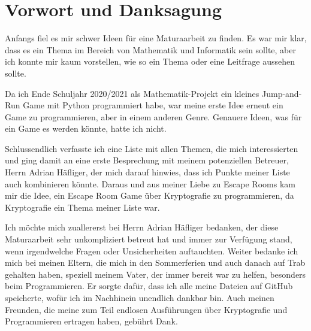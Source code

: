 \section{Vorwort und Danksagung}
\label{sec:vorwort}

Anfangs fiel es mir schwer Ideen für eine Maturaarbeit zu finden. Es war mir klar, dass es ein Thema im Bereich von Mathematik und Informatik sein sollte, aber ich konnte mir kaum vorstellen, wie so ein Thema oder eine Leitfrage aussehen sollte.

Da ich Ende Schuljahr 2020/2021 als Mathematik-Projekt ein kleines Jump-and-Run Game mit Python programmiert habe, war meine erste Idee erneut ein Game zu programmieren, aber in einem anderen Genre. Genauere Ideen, was für ein Game es werden könnte, hatte ich nicht.

Schlussendlich verfasste ich eine Liste mit allen Themen, die mich interessierten und ging damit an eine erste Besprechung mit meinem potenziellen Betreuer, Herrn Adrian Häfliger, der mich darauf hinwies, dass ich Punkte meiner Liste auch kombinieren könnte. Daraus und aus meiner Liebe zu Escape Rooms kam mir die Idee, ein Escape Room Game über Kryptografie zu programmieren, da Kryptografie ein Thema meiner Liste war.

Ich möchte mich zuallererst bei Herrn Adrian Häfliger bedanken, der diese Maturaarbeit sehr unkompliziert betreut hat und immer zur Verfügung stand, wenn irgendwelche Fragen oder Unsicherheiten auftauchten. Weiter bedanke ich mich bei meinen Eltern, die mich in den Sommerferien und auch danach auf Trab gehalten haben, speziell meinem Vater, der immer bereit war zu helfen, besonders beim Programmieren. Er sorgte dafür, dass ich alle meine Dateien auf GitHub speicherte, wofür ich im Nachhinein unendlich dankbar bin. Auch meinen Freunden, die meine zum Teil endlosen Ausführungen über Kryptografie und Programmieren ertragen haben, gebührt Dank.
